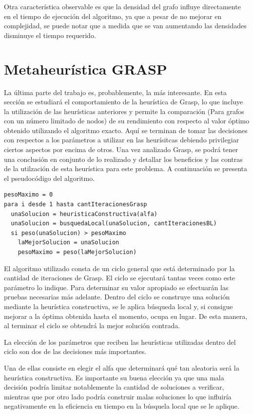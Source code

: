 \documentclass[a4paper,11pt] {article}
\begin{document}
Otra característica observable es que la densidad del grafo influye directamente en el tiempo de ejecución del algoritmo, ya que a pesar de no mejorar en complejidad, se puede notar que a medida que se van aumentando las 
densidades disminuye el tiempo requerido. 

\section{Metaheur\'istica GRASP}

La última parte del trabajo es, probablemente, la más interesante. En esta sección se estudiará el comportamiento de la heurística de Grasp, lo que incluye la utilización de las heurísticas anteriores y permite la comparación (Para grafos con un número limitado de nodos) de su rendimiento con respecto al valor óptimo obtenido utilizando el algoritmo exacto. Aquí se terminan de tomar las decisiones con respectos a los parámetros a utilizar en las heurísitcas debiendo privilegiar ciertos aspectos por encima de otros. Una vez analizado Grasp, se podrá tener una conclusión en conjunto de lo realizado y detallar los beneficios y las contras de la utilzación de esta heurística para este problema.
A continuación se presenta el pseudocódigo del algoritmo.

\begin{verbatim}
pesoMaximo = 0
para i desde 1 hasta cantIteracionesGrasp
  unaSolucion = heuristicaConstructiva(alfa)
  unaSolucion = busquedaLocal(unaSolucion, cantIteracionesBL)
  si peso(unaSolucion) > pesoMaximo
    laMejorSolucion = unaSolucion
    pesoMaximo = peso(laMejorSolucion)
\end{verbatim}

El algoritmo utilizado consta de un ciclo general que está determinado por la cantidad de iteraciones de Grasp. El ciclo se ejecutará tantas veces como este parámetro lo indique. Para determinar su valor apropiado se efectuarán las pruebas necesarias más adelante. Dentro del ciclo se construye una solución mediante la heurística constructiva, se le aplica búsqueda local y, si consigue mejorar a la óptima obtenida hasta el momento, ocupa su lugar. De esta manera, al terminar el ciclo se obtendrá la mejor solución contrada.

La elección de los parámetros que reciben las heurísticas utilizadas dentro del ciclo son dos de las decisiones más importantes.

Una de ellas consiste en elegir el alfa que determinará qué tan aleatoria será la heurística constructiva. Es importante su buena elección ya que una mala decisión podría limitar notablemente la cantidad de soluciones a verificar, mientras que por otro lado podría construir malas soluciones lo que influiría negativamente en la eficiencia en tiempo en la búsquela local que se le aplique.
\end{document}
